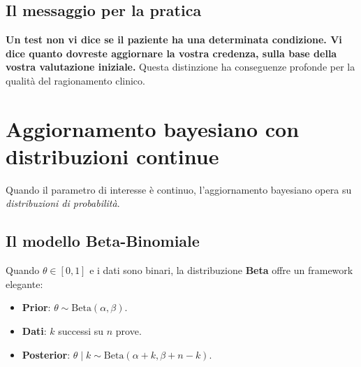\documentclass[
  italian,
  letterpaper,
  a4paper,
  11pt,
  open=any]{scrbook}
\providecommand{\tightlist}{%
  \setlength{\itemsep}{0pt}\setlength{\parskip}{0pt}}
\theoremstyle{plain}
\theoremstyle{definition}
\theoremstyle{definition}
\theoremstyle{remark}
\begin{document}
\subsection{Il messaggio per la
pratica}\label{il-messaggio-per-la-pratica}

\textbf{Un test non vi dice se il paziente ha una determinata
condizione. Vi dice quanto dovreste aggiornare la vostra credenza, sulla
base della vostra valutazione iniziale.} Questa distinzione ha
conseguenze profonde per la qualità del ragionamento clinico.

\section{Aggiornamento bayesiano con distribuzioni
continue}\label{sec-bayes-continuous}

Quando il parametro di interesse è continuo, l'aggiornamento bayesiano
opera su \emph{distribuzioni di probabilità}.

\subsection{Il modello Beta-Binomiale}\label{il-modello-beta-binomiale}

Quando \(\theta \in [0,1]\) e i dati sono binari, la distribuzione
\textbf{Beta} offre un framework elegante:

\begin{tcolorbox}[enhanced jigsaw, arc=.35mm, bottomrule=.15mm, bottomtitle=1mm, breakable, colback=white, colbacktitle=quarto-callout-important-color!10!white, colframe=quarto-callout-important-color-frame, coltitle=black, left=2mm, leftrule=.75mm, opacityback=0, opacitybacktitle=0.6, rightrule=.15mm, title=\textcolor{quarto-callout-important-color}{\faExclamation}\hspace{0.5em}{Coniugazione Beta-Binomiale}, titlerule=0mm, toprule=.15mm, toptitle=1mm]

\begin{itemize}
\tightlist
\item
  \textbf{Prior}: \(\theta \sim \text{Beta}(\alpha, \beta)\).
\item
  \textbf{Dati}: \(k\) successi su \(n\) prove.
\item
  \textbf{Posterior}:
  \(\theta \mid k \sim \text{Beta}(\alpha + k, \beta + n - k)\).
\end{itemize}

\end{tcolorbox}
\end{document}
